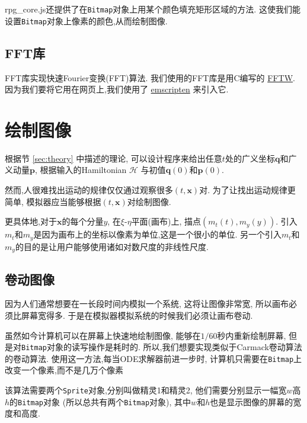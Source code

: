 \documentclass[12pt]{article}
\begin{document}
rpg\_core.js还提供了在\texttt{Bitmap}对象上用某个颜色填充矩形区域的方法.
这使我们能设置\texttt{Bitmap}对象上像素的颜色,从而绘制图像.

\subsection{FFT库}
\label{sec:fft}

FFT库实现快速Fourier变换(FFT)算法.
我们使用的FFT库是用C编写的 \href{http://www.fftw.org}{FFTW}.
因为我们要将它用在网页上,我们使用了 \href{https://emscripten.org}{emscripten} 来引入它.

\section{绘制图像}

根据节 \ref{sec:theory} 中描述的理论,
可以设计程序来给出任意$t$处的广义坐标$\mathbf q$和广义动量$\mathbf p$,
根据输入的Hamiltonian $\mathcal H$
与初值$\mathbf q\left(0\right)$和$\mathbf p\left(0\right)$.

然而,人很难找出运动的规律仅仅通过观察很多$\left(t,\mathbf x\right)$对.
为了让找出运动规律更简单,
模拟器应当能够根据$\left(t,\mathbf x\right)$对绘制图像.

更具体地,对于$\mathbf x$的每个分量$y$,
在$\xi$-$\eta$平面(画布)上,
描点$\left(m_t\left(t\right),m_y\left(y\right)\right)$.
引入$m_t$和$m_y$是因为画布上的坐标以像素为单位,这是一个很小的单位.
另一个引入$m_t$和$m_y$的目的是让用户能够使用诸如对数尺度的非线性尺度.

\subsection{卷动图像}

因为人们通常想要在一长段时间内模拟一个系统,
这将让图像非常宽,
所以画布必须比屏幕宽得多.
于是在模拟器模拟系统的时候我们必须让画布卷动.

虽然如今计算机可以在屏幕上快速地绘制图像,
能够在$1/60$秒内重新绘制屏幕,
但是对\texttt{Bitmap}对象的读写操作是耗时的.
所以,我们想要实现类似于Carmack卷动算法的卷动算法.
使用这一方法,每当ODE求解器前进一步时,
计算机只需要在\texttt{Bitmap}上改变一个像素,而不是几万个像素

该算法需要两个\texttt{Sprite}对象,分别叫做精灵1和精灵2,
他们需要分别显示一幅宽$w$高$h$的\texttt{Bitmap}对象
(所以总共有两个\texttt{Bitmap}对象),
其中$w$和$h$也是显示图像的屏幕的宽度和高度.
\end{document}
